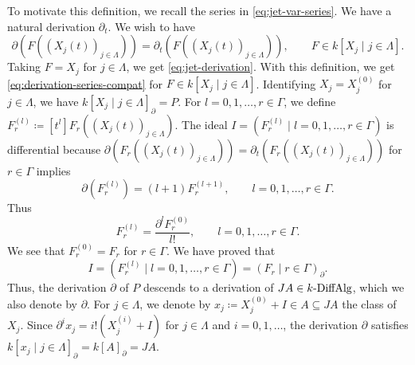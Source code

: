 \documentclass[a4paper, 12pt, reqno]{amsart}
\theoremstyle{remark}
\begin{document}
To motivate this definition, we recall the series in \eqref{eq:jet-var-series}.
We have a natural derivation $\partial_t$.
We wish to have
\begin{equation}
  \label{eq:derivation-series-compat}
  \partial(F((X_j(t))_{j \in \Lambda})) = \partial_t(F((X_j(t))_{j \in \Lambda})), \qquad F \in k[X_j \mid j \in \Lambda].
\end{equation}
Taking $F = X_j$ for $j \in \Lambda$, we get \eqref{eq:jet-derivation}.
With this definition, we get \eqref{eq:derivation-series-compat} for $F \in k[X_j \mid j \in \Lambda]$.
Identifying $X_j = X_j^{(0)}$ for $j \in \Lambda$, we have $k[X_j \mid j \in \Lambda]_\partial = P$.
For $l = 0, 1, \dots, r \in \Gamma$, we define $F^{(l)}_r \coloneq [t^l]F_r((X_j(t))_{j \in \Lambda})$.
The ideal $I = (F_r^{(l)} \mid l = 0, 1, \dots, r \in \Gamma)$ is differential because $\partial(F_r((X_j(t))_{j \in \Lambda})) = \partial_t(F_r((X_j(t))_{j \in \Lambda}))$ for $r \in \Gamma$ implies
\begin{equation*}
  \partial(F_r^{(l)}) = (l + 1)F_r^{(l + 1)}, \qquad l = 0, 1, \dots, r \in \Gamma.
\end{equation*}
Thus
\begin{equation*}
  F_r^{(l)} = \frac{\partial^lF_r^{(0)}}{l!}, \qquad l = 0, 1, \dots, r \in \Gamma.
\end{equation*}
We see that $F_r^{(0)} = F_r$ for $r \in \Gamma$.
We have proved that
\begin{equation*}
  I = (F_r^{(l)} \mid l = 0, 1, \dots, r \in \Gamma) = (F_r \mid r \in \Gamma)_\partial.
\end{equation*}
Thus, the derivation $\partial$ of $P$ descends to a derivation of $J A \in k\textnormal{-DiffAlg}$, which we also denote by $\partial$.
For $j \in \Lambda$, we denote by $x_j \coloneq X_j^{(0)} + I \in A \subseteq J A$ the class of $X_j$.
Since $\partial^i x_j = i!(X_j^{(i)} + I)$ for $j \in \Lambda$ and $i = 0, 1, \dots$, the derivation $\partial$ satisfies $k[x_j \mid j \in \Lambda]_\partial = k[A]_\partial = JA$.
\end{document}
